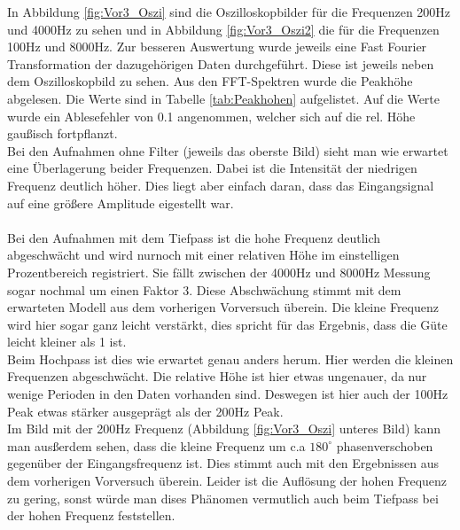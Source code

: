 \documentclass[12pt,a4paper]{article}
\begin{document}
In Abbildung \ref{fig:Vor3_Oszi} sind die Oszilloskopbilder für die Frequenzen 200Hz und 4000Hz zu sehen und in Abbildung \ref{fig:Vor3_Oszi2} die für die Frequenzen 100Hz und 8000Hz. Zur besseren Auswertung wurde jeweils eine Fast Fourier Transformation der dazugehörigen Daten durchgeführt. Diese ist jeweils neben dem Oszilloskopbild zu sehen. Aus den FFT-Spektren wurde die Peakhöhe abgelesen. Die Werte sind in Tabelle \ref{tab:Peakhohen} aufgelistet. Auf die Werte wurde ein Ablesefehler von 0.1 angenommen, welcher sich auf die rel. Höhe gaußisch fortpflanzt. 
\\
Bei den Aufnahmen ohne Filter (jeweils das oberste Bild) sieht man wie erwartet eine Überlagerung beider Frequenzen. Dabei ist die Intensität der niedrigen Frequenz deutlich höher. Dies liegt aber einfach daran, dass das Eingangsignal auf eine größere Amplitude eigestellt war.\\
\\
Bei den Aufnahmen mit dem Tiefpass ist die hohe Frequenz deutlich abgeschwächt und wird nurnoch mit einer relativen Höhe im einstelligen Prozentbereich registriert. Sie fällt zwischen der 4000Hz und 8000Hz Messung sogar nochmal um einen Faktor 3. Diese Abschwächung stimmt mit dem erwarteten Modell aus dem vorherigen Vorversuch überein. Die kleine Frequenz wird hier sogar ganz leicht verstärkt, dies spricht für das Ergebnis, dass die Güte leicht kleiner als 1 ist.
\\
Beim Hochpass ist dies wie erwartet genau anders herum. Hier werden die kleinen Frequenzen abgeschwächt. Die relative Höhe ist hier etwas ungenauer, da nur wenige Perioden in den Daten vorhanden sind. Deswegen ist hier auch der 100Hz Peak etwas stärker ausgeprägt als der 200Hz Peak.\\
Im Bild mit der 200Hz Frequenz (Abbildung \ref{fig:Vor3_Oszi} unteres Bild) kann man ausßerdem sehen, dass die kleine Frequenz um c.a $180^\circ$ phasenverschoben gegenüber der Eingangsfrequenz ist. Dies stimmt auch mit den Ergebnissen aus dem vorherigen Vorversuch überein. Leider ist die Auflösung der hohen Frequenz zu gering, sonst würde man dises Phänomen vermutlich auch beim Tiefpass bei der hohen Frequenz feststellen. 
\end{document}
